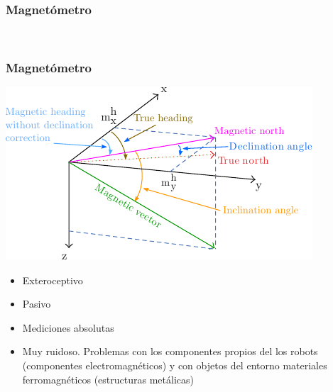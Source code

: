 \begin{frame}
    \frametitle{Magnetómetro}
    \begin{figure}[!h]
        \centering
        \\
    \end{figure}
\end{frame}


\begin{frame}
    \frametitle{Magnetómetro}

    \begin{center}
        \includegraphics[width=0.5\columnwidth]{images/magnetic_field.pdf}
    \end{center}

    \begin{itemize}
        \item Exteroceptivo
        \item Pasivo
        \item Mediciones absolutas
        \item Muy ruidoso. Problemas con los componentes propios del los robots (componentes electromagnéticos) y con objetos del entorno materiales ferromagnéticos (estructuras metálicas)
    \end{itemize}
\end{frame}

